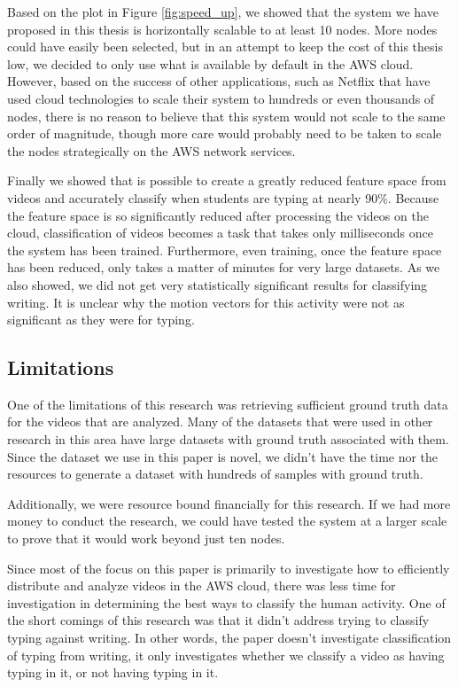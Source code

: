 Based on the plot in Figure \ref{fig:speed_up}, we showed that the system
we have proposed in this thesis is horizontally scalable to at least 10 nodes.
More nodes could have easily been selected, but in an attempt to keep the cost
of this thesis low, we decided to only use what is available by default in the
AWS cloud. However, based on the success of other applications, such as
Netflix that have used cloud technologies to scale their system to hundreds
or even thousands of nodes, there is no reason to believe that this system
would not scale to the same order of magnitude, though more care would probably
need to be taken to scale the nodes strategically on the AWS network services.

Finally we showed that is possible to create a greatly reduced feature space
from videos and accurately classify when students are typing at nearly 90\%.
Because the feature space is so significantly reduced after processing the
videos on the cloud, classification of videos becomes a task that takes only
milliseconds once the system has been trained. Furthermore, even training, once
the feature space has been reduced, only takes a matter of minutes for very
large datasets. As we also showed, we did not get very statistically significant
results for classifying writing. It is unclear why the motion vectors for this
activity were not as significant as they were for typing.

\subsection{Limitations}
One of the limitations of this research was retrieving sufficient ground truth
data for the videos that are analyzed. Many of the datasets that were
used in other research in this area have large datasets with ground truth
associated with them. Since the dataset we use in this paper is novel, we didn't
have the time nor the resources to generate a dataset with hundreds of samples
with ground truth.

Additionally, we were resource bound financially for this research. If we had more
money to conduct the research, we could have tested the system at a larger
scale to prove that it would work beyond just ten nodes.

Since most of the focus on this paper is primarily to investigate how to
efficiently distribute and analyze videos in the AWS cloud, there was less time
for investigation in determining the best ways to classify the human activity.
One of the short comings of this research was that it didn't address trying to
classify typing against writing. In other words, the paper doesn't investigate
classification of typing from writing, it only investigates whether we classify
a video as having typing in it, or not having typing in it.



